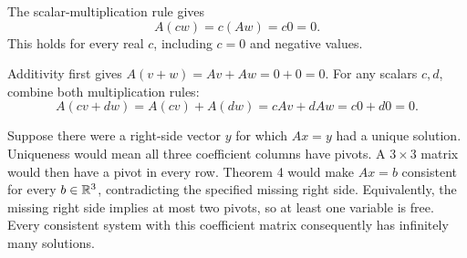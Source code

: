 The scalar-multiplication rule gives
\[A(cw)=c(Aw)=c0=0.\]
This holds for every real $c$, including $c=0$ and negative values.

Additivity first gives $A(v+w)=Av+Aw=0+0=0$.
For any scalars $c,d$, combine both multiplication rules:
\[A(cv+dw)=A(cv)+A(dw)=cAv+dAw=c0+d0=0.\]

Suppose there were a right-side vector $y$ for which $Ax=y$ had a
unique solution. Uniqueness would mean all
three coefficient columns have pivots. A $3\times3$ matrix would
then have a pivot in every row. Theorem 4 would make $Ax=b$
consistent for every $b\in\mathbb{R}^3$, contradicting the specified missing
right side.
Equivalently, the missing right side implies at most two pivots,
so at least one variable is free. Every consistent system with this
coefficient matrix consequently has infinitely many solutions.
